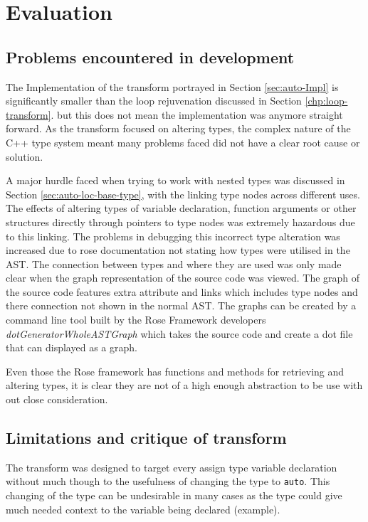 \documentclass[bsc,frontabs,singlespacing,parskip,deptreport]{infthesis}
\begin{document}
\section{Evaluation} %

\subsection{Problems encountered in development}

The Implementation of the transform portrayed in Section \ref{sec:auto-Impl} is significantly smaller than the loop rejuvenation discussed in Section \ref{chp:loop-transform}. but this does not mean the implementation was anymore straight forward. As the transform focused on altering types, the complex nature of the C++ type system meant many problems faced did not have a clear root cause or solution. 

A major hurdle faced when trying to work with nested types was discussed in Section \ref{sec:auto-loc-base-type}, with the linking type nodes across different uses. The effects of altering types of variable declaration, function arguments or other structures directly through pointers to type nodes was extremely hazardous due to this linking. The problems in debugging this incorrect type alteration was increased due to rose documentation not stating how types were utilised in the AST. The connection between types and where they are used was only made clear when the graph representation of the source code was viewed. The graph of the source code features extra attribute and links which includes type nodes and there connection not shown in the normal AST. The graphs can be created by a command line tool built by the Rose Framework developers \textit{dotGeneratorWholeASTGraph} \cite{ROSE_TUT} which takes the source code and create a dot file that can displayed as a graph.

Even those the Rose framework has functions and methods for retrieving and altering types, it is clear they are not of a high enough abstraction to be use with out close consideration.

\subsection{Limitations and critique of transform} 

The transform was designed to target every assign type variable declaration without much though to the usefulness of changing the type to \texttt{auto}. This changing of the type can be undesirable in many cases as the type could give much needed context to the variable being declared (example). 
\end{document}
